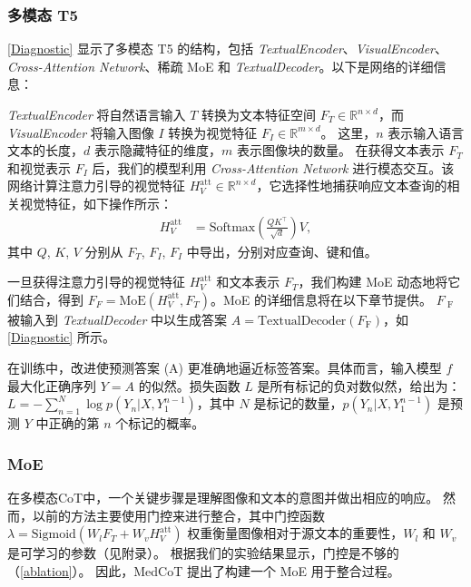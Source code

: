 \documentclass[11pt]{article}
\begin{document}
\subsubsection{多模态 T5}

\autoref{Diagnostic} 显示了多模态 T5 的结构，包括 \textit{TextualEncoder}、\textit{VisualEncoder}、\textit{Cross-Attention Network}、稀疏 MoE 和 \textit{TextualDecoder}。以下是网络的详细信息：

\textit{TextualEncoder} 将自然语言输入 \( {T} \) 转换为文本特征空间 \( F_T \in \mathbb{R}^{n \times d} \)，而 \textit{VisualEncoder} 将输入图像 \( I \) 转换为视觉特征 \( F_I \in \mathbb{R}^{m \times d} \)。
这里，\( n \) 表示输入语言文本的长度，\( d \) 表示隐藏特征的维度，\( m \) 表示图像块的数量。
在获得文本表示 \( F_T \) 和视觉表示 \( F_I \) 后，我们的模型利用 \textit{Cross-Attention Network} 进行模态交互。该网络计算注意力引导的视觉特征 \( H_{V}^{\text{att}} \in \mathbb{R}^{n \times d} \)，它选择性地捕获响应文本查询的相关视觉特征，如下操作所示：
\begin{align}
        H_{V}^{\text{att}} &= \text{Softmax}\left(\frac{QK^{\top}}{\sqrt{d}}\right)V,
\end{align}
其中 $Q$, $K$, $V$ 分别从 $F_T$, $F_I$, $F_I$ 中导出，分别对应查询、键和值。

一旦获得注意力引导的视觉特征 \( H_{V}^{\text{att}} \) 和文本表示 \( F_T \)，我们构建 MoE 动态地将它们结合，得到 \( F_F = \text{MoE} (H_{V}^{\text{att}}, F_T) \)。MoE 的详细信息将在以下章节提供。
$F_{\text{ F}}$ 被输入到 \textit{TextualDecoder} 中以生成答案
$A = \text{TextualDecoder}(F_{\text{F}})$，如 \autoref{Diagnostic} 所示。

在训练中，改进使预测答案 (A) 更准确地逼近标签答案。具体而言，输入模型 $f$ 最大化正确序列 $Y = {A}$ 的似然。损失函数 $L$ 是所有标记的负对数似然，给出为：$L = -\sum_{n=1}^{N} \log p(Y_n | X, Y_1^{n-1})$，其中 $N$ 是标记的数量，$p(Y_n | X, Y_1^{n-1})$ 是预测 $Y$ 中正确的第 $n$ 个标记的概率。
\subsubsection{MoE}

在多模态CoT中，一个关键步骤是理解图像和文本的意图并做出相应的响应。
然而，以前的方法主要使用门控来进行整合，其中门控函数 \( \lambda = \text{Sigmoid}(W_l F_T + W_v H_V^{\text{att}}) \) 权重衡量图像相对于源文本的重要性，\( W_l \) 和 \( W_v \) 是可学习的参数（见附录）\cite{zhang2023multimodal, zheng2023ddcot}。
根据我们的实验结果显示，门控是不够的（\autoref{ablation}）。
因此，MedCoT 提出了构建一个 MoE 用于整合过程。
\end{document}
